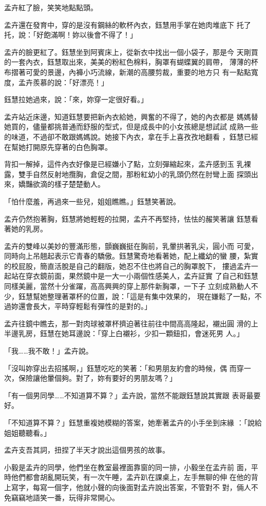 孟卉紅了臉，笑笑地點點頭。

孟卉還在發育中，穿的是沒有鋼絲的軟杯內衣，鈺慧用手掌在她肉堆底下
托了托，說：「好飽滿啊！妳以後會不得了！」

孟卉的臉更紅了。鈺慧坐到阿賓床上，從新衣中找出一個小袋子，那是今
天剛買的一套內衣，鈺慧取出來，美美的粉紅色棉料，胸罩有蝴蝶翼的肩帶，
薄薄的杯布摺著可愛的景邊，內褲小巧流線，新潮的高腰剪裁，重要的地方只
有一點點寬度，孟卉羨慕的說：「好漂亮！」

鈺慧拉她過來，說：「來，妳穿一定很好看。」

孟卉站近床邊，知道鈺慧要把新內衣給她，興奮的不得了，她的內衣都是
媽媽替她買的，儘量都挑普通而舒服的型式，但是成長中的小女孩總是想試試
成熟一些的味道，不過卻不敢跟媽媽說。她接下內衣，拿在手上喜孜孜地翻看
，鈺慧已經在幫她打開原先穿著的白色胸罩。

背扣一解掉，這件內衣好像是已經嫌小了點，立刻彈縮起來，孟卉感到玉
乳裸露，雙手自然反射地攬胸，倉促之間，那粉紅幼小的乳頭仍然在肘彎上面
探頭出來，嬌豔欲滴的樣子楚楚動人。

「怕什麼羞，再過來一些兒，姐姐瞧瞧。」鈺慧笑著說。

孟卉仍然抱著胸，鈺慧將她輕輕的拉開，孟卉不再堅持，怯怯的赧笑著讓
鈺慧看著她的乳房。

孟卉的雙峰以美妙的豐滿形態，顫巍巍挺在胸前，乳暈拱著乳尖，圓小而
可愛，同時向上吊翹起表示它青春的驕傲。鈺慧驚奇地看著她，配上纖幼的蠻
腰，紮實的校屁股，簡直活脫是自己的翻版，她忍不住也將自己的胸罩脫下，
摟過孟卉一起站在穿衣鏡前面，果然鏡中是一大一小兩個性感美人，孟卉証實
了自己和鈺慧同樣美麗，當然十分雀躍，高高興興的穿上那件新胸罩，一下子
立刻成熟動人不少，鈺慧幫她整理著罩杯的位置，說：「這是有集中效果的，
現在嫌鬆了一點，不過妳還會長大，平時穿輕鬆有彈性的是對的。」

孟卉往鏡中瞧去，那一對肉球被罩杯擠迫著往前往中間高高隆起，襯出圓
滑的上半邊乳房，鈺慧在她耳邊說：「穿上白襯衫，少扣一顆鈕扣，會迷死男
人。」

「我……我不敢！」孟卉說。

「沒叫妳穿出去招搖啊，」鈺慧吃吃的笑著：「和男朋友約會的時候，偶
而穿一次，保險讓他暈個夠。對了，妳有要好的男朋友嗎？」

「有一個男同學……不知道算不算？」孟卉說，當然不能跟鈺慧說其實跟
表哥最要好。

「不知道算不算？」鈺慧重複她模糊的答案，她牽著孟卉的小手坐到床緣
：「說給姐姐聽聽看。」

孟卉支吾其詞，扭捏了半天才說出這個男孩的故事。

小毅是孟卉的同學，他們坐在教室最裡面靠窗的同一排，小毅坐在孟卉前
面，平時他們都會胡亂開玩笑，有一次午睡，孟卉趴在課桌上，左手無聊的伸
在他的背上寫字，每寫一個字，他就小聲的向後面對孟卉說出答案，不管對不
對，倆人不免竊竊地語笑一番，玩得非常開心。


